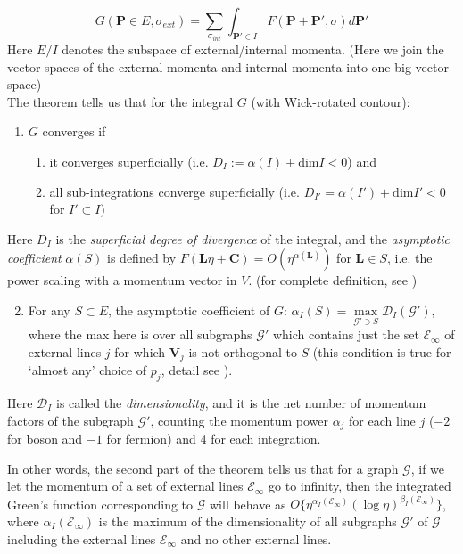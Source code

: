 \documentclass{article}
\begin{document}
\begin{equation}
    G(\mathbf{P}\in E, \sigma_{ext}) = \sum_{\sigma_{int}}\int_{\mathbf{P'}\in I}F(\mathbf{P+P'},\sigma) d\mathbf{P'}
\end{equation}
Here $E/I$ denotes the subspace of external/internal momenta. (Here we join the vector spaces of the external momenta and internal momenta into one big vector space)\\

The theorem tells us that for the integral $G$ (with Wick-rotated contour):
\begin{enumerate}
    \item $G$ converges if 
    \begin{enumerate}
        \item it converges superficially (i.e. $D_I:=\alpha(I)+\text{dim}I<0$) and 
        \item all sub-integrations converge superficially (i.e. $D_{I'}=\alpha(I')+\text{dim}I'<0$ for $I'\subset I$)
    \end{enumerate}
\end{enumerate}
Here $D_I$ is the \textit{superficial degree of divergence} of the integral, and the \textit{asymptotic coefficient} $\alpha(S)$ is defined by $F(\mathbf{L}\eta+\mathbf{C}) = O(\eta^{\alpha(\mathbf{L})})$ for $\mathbf{L}\in S$, i.e. the power scaling with a momentum vector in $V$. (for complete definition, see \cite[\S III]{weinberg})

\begin{enumerate}
\setcounter{enumi}{1}
    \item For any $S \subset E$, the asymptotic coefficient of $G$: $\alpha_I(S)=\max\limits_{\mathcal{G'}\ni S} \mathcal{D}_I(\mathcal{G'})$, where the max here is over all subgraphs $\mathcal{G'}$ which contains just the set $\mathcal{E}_\infty$ of external lines $j$ for which $\mathbf{V}_j$ is not orthogonal to $S$ (this condition is true for `almost any' choice of $p_j$, detail see \cite[\S V]{weinberg}). 
\end{enumerate}
Here $\mathcal{D}_I$ is called the \textit{dimensionality}, and it is the net number of momentum factors of the subgraph $\mathcal{G'}$, counting the momentum power $\alpha_j$ for each line $j$ ($-2$ for boson and $-1$ for fermion) and 4 for each integration. 

In other words, the second part of the theorem tells us that for a graph $\mathcal{G}$, if we let the momentum of a set of external lines $\mathcal{E}_\infty$ go to infinity, then the integrated Green's function corresponding to $\mathcal{G}$ will behave as $O\{\eta^{\alpha_I(\mathcal{E}_\infty)}(\log \eta)^{\beta_I(\mathcal{E}_\infty)}\}$, where $\alpha_I(\mathcal{E}_\infty)$ is the maximum of the dimensionality of all subgraphs $\mathcal{G'}$ of $\mathcal{G}$ including the external lines $\mathcal{E}_\infty$ and no other external lines.
\end{document}
